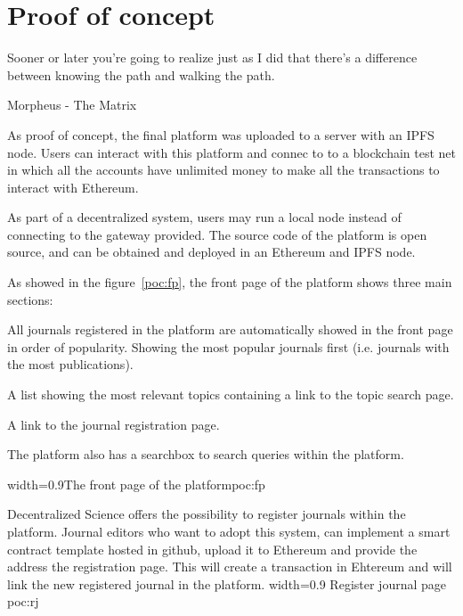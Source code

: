 \chapter{Proof of concept}

\begin{FraseCelebre}
  \begin{Frase}
    Sooner or later you're going to realize just as I did that there's a
    difference between knowing the path and walking the path.
  \end{Frase}
  \begin{Fuente}
    Morpheus - The Matrix
  \end{Fuente}
\end{FraseCelebre}

As proof of concept, the final platform was uploaded to a server with an IPFS
node. Users can interact with this platform and connec to to a blockchain test
net in which all the accounts have unlimited money to make all the transactions
to interact with Ethereum.

As part of a decentralized system, users may run a local node instead of
connecting to the gateway provided. The source code of the platform is open
source, and can be obtained and deployed in an Ethereum and IPFS node.


As showed in the figure~\ref{poc:fp}, the front page of the platform shows three
main sections:

\begin{itemize}
   All journals registered in
  the platform are automatically showed in the front page in order of
  popularity. Showing the most popular journals first (i.e. journals with the
  most publications).

   A list showing the most relevant topics containing a
  link to the topic search page.

   A link to the journal registration page.

\end{itemize}

The platform also has a searchbox to search queries within the platform.

 {width=0.9\linewidth}{The front page of the
  platform}{poc:fp}


Decentralized Science offers the possibility to register journals within the
platform. Journal editors who want to adopt this system, can implement a smart
contract template hosted in github, upload it to Ethereum and provide the
address the registration page. This will create a transaction in Ehtereum and
will link the new registered journal in the platform. %
{width=0.9\linewidth}%
{Register journal page}%
{poc:rj}

